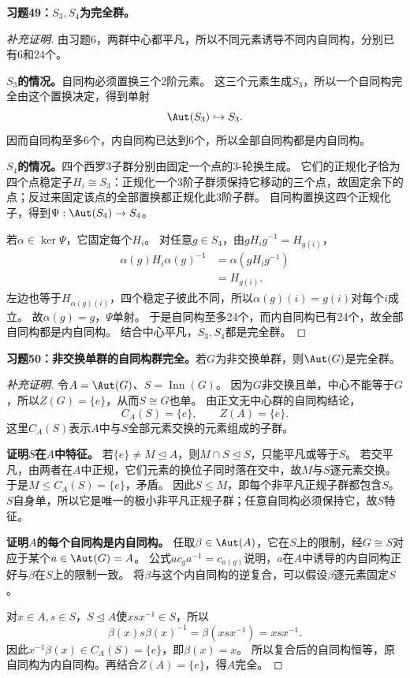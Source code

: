 \begin{problem}
\textbf{习题49：$S_3,S_4$为完全群。}
\end{problem}
\begin{proof}[补充证明]
由习题6，两群中心都平凡，所以不同元素诱导不同内自同构，分别已有6和24个。

\textbf{$S_3$的情况。}自同构必须置换三个2阶元素。
这三个元素生成$S_3$，所以一个自同构完全由这个置换决定，得到单射
\[
\Aut(S_3)\hookrightarrow S_3.
\]
因而自同构至多6个，内自同构已达到6个，所以全部自同构都是内自同构。

\textbf{$S_4$的情况。}四个西罗3子群分别由固定一个点的3-轮换生成。
它们的正规化子恰为四个点稳定子$H_i\cong S_3$：正规化一个3阶子群须保持它移动的三个点，故固定余下的点；反过来固定该点的全部置换都正规化此3阶子群。
自同构置换这四个正规化子，得到$\Psi:\Aut(S_4)\to S_4$。

若$\alpha\in\ker\Psi$，它固定每个$H_i$。
对任意$g\in S_4$，由$gH_ig^{-1}=H_{g(i)}$，
\begin{align*}
\alpha(g)H_i\alpha(g)^{-1}
&=\alpha(gH_ig^{-1})\\
&=H_{g(i)}.
\end{align*}
左边也等于$H_{\alpha(g)(i)}$，四个稳定子彼此不同，所以$\alpha(g)(i)=g(i)$对每个$i$成立。
故$\alpha(g)=g$，$\Psi$单射。
于是自同构至多24个，而内自同构已有24个，故全部自同构都是内自同构。
结合中心平凡，$S_3,S_4$都是完全群。
\end{proof}

\begin{problem}
\textbf{习题50：非交换单群的自同构群完全。}若$G$为非交换单群，则$\Aut(G)$是完全群。
\end{problem}
\begin{proof}[补充证明]
令$A=\Aut(G)$、$S=\operatorname{Inn}(G)$。
因为$G$非交换且单，中心不能等于$G$，所以$Z(G)=\{e\}$，从而$S\cong G$也单。
由正文无中心群的自同构结论，
\[
C_A(S)=\{e\},\qquad Z(A)=\{e\}.
\]
这里$C_A(S)$表示$A$中与$S$全部元素交换的元素组成的子群。

\textbf{证明$S$在$A$中特征。}
若$\{e\}\neq M\trianglelefteq A$，则$M\cap S\trianglelefteq S$，只能平凡或等于$S$。
若交平凡，由两者在$A$中正规，它们元素的换位子同时落在交中，故$M$与$S$逐元素交换。
于是$M\leq C_A(S)=\{e\}$，矛盾。
因此$S\leq M$，即每个非平凡正规子群都包含$S$。
$S$自身单，所以它是唯一的极小非平凡正规子群；任意自同构必须保持它，故$S$特征。

\textbf{证明$A$的每个自同构是内自同构。}
任取$\beta\in\Aut(A)$，它在$S$上的限制，经$G\cong S$对应于某个$a\in\Aut(G)=A$。
公式$a c_g a^{-1}=c_{a(g)}$说明，$a$在$A$中诱导的内自同构正好与$\beta$在$S$上的限制一致。
将$\beta$与这个内自同构的逆复合，可以假设$\beta$逐元素固定$S$。

对$x\in A,s\in S$，$S\trianglelefteq A$使$xsx^{-1}\in S$，所以
\[
\beta(x)s\beta(x)^{-1}=\beta(xsx^{-1})=xsx^{-1}.
\]
因此$x^{-1}\beta(x)\in C_A(S)=\{e\}$，即$\beta(x)=x$。
所以复合后的自同构恒等，原自同构为内自同构。再结合$Z(A)=\{e\}$，得$A$完全。
\end{proof}

